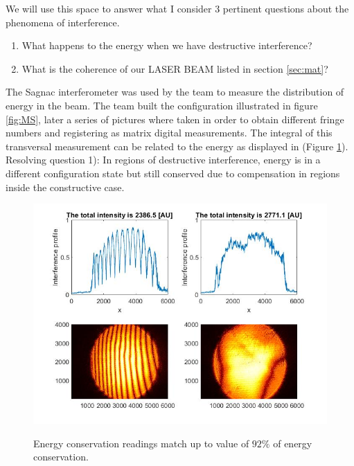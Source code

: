 We will use this space to answer what I consider 3 pertinent questions about the phenomena of interference. 
\begin{enumerate}
    \item What happens to the energy when we have destructive interference?
    
    \item What is the coherence of our LASER BEAM listed in section \ref{sec:mat}? 
\end{enumerate}

The Sagnac interferometer was used by the team to measure the distribution of energy in the beam. The team built the configuration illustrated in figure \ref{fig:MS}, later a series of pictures where taken in order to obtain different fringe numbers and registering as matrix digital measurements. The integral of this transversal measurement can be related to the energy as displayed in (Figure \ref{fig:SagResult}). Resolving question 1): In regions of destructive interference, energy is in a different configuration state but still conserved due to compensation in regions inside the constructive case.
\begin{figure}[H]
    \centering
    \includegraphics[scale=0.25]{Figures/Figures_I/SagnacResult_EnergyConservation.jpg}
    \label{fig:SagResult}
    \caption{Energy conservation readings match up to value of $92\%$ of energy conservation. }
\end{figure}

